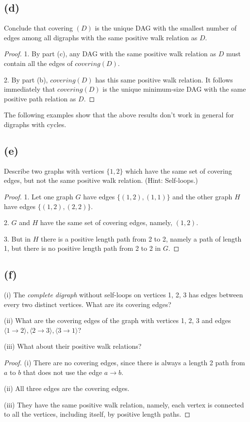 \documentclass[14pt]{extarticle}
\begin{document}
\subsection{(d)}
Conclude that covering $(D)$ is the unique DAG with the smallest number of edges among all digraphs with the same positive walk relation as $D$.
\begin{proof}
1. By part (c), any DAG with the same positive walk relation as $D$ must contain all the edges of $covering(D)$. 

2. By part (b), $covering(D)$ has this same positive walk relation. It follows immediately that $covering(D)$ is the unique minimum-size DAG with the same positive path relation as $D$.
\end{proof}

The following examples show that the above results don't work in general for digraphs with cycles.

\subsection{(e)}
Describe two graphs with vertices $\{1, 2\}$ which have the same set of covering edges, but not the same positive walk relation. (Hint: Self-loops.)
\begin{proof}
1. Let one graph $G$ have edges $\{(1, 2), (1, 1)\}$ and the other graph $H$ have edges $\{(1, 2), (2, 2)\}$. 

2. $G$ and $H$ have the same set of covering edges, namely, $(1, 2)$. 

3. But in $H$ there is a positive length path from 2 to 2, namely a path of length 1, but there is no positive length path from 2 to 2 in $G$.
\end{proof}

\subsection{(f)}
(i) The {\it complete digraph} without self-loops on vertices 1, 2, 3 has edges between every two distinct vertices. What are its covering edges?

(ii) What are the covering edges of the graph with vertices 1, 2, 3 and edges $\langle 1 \to 2 \rangle, \langle 2 \to 3 \rangle, \langle 3 \to 1\rangle$?

(iii) What about their positive walk relations?
\begin{proof}
(i) There are no covering edges, since there is always a length 2 path from $a$ to $b$ that does not use the edge $a \to b$.

(ii) All three edges are the covering edges.

(iii) They have the same positive walk relation, namely, each vertex is connected to all the vertices, including itself, by positive length paths.
\end{proof}
\end{document}
